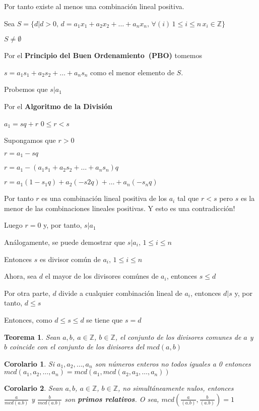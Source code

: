 \documentclass[a4paper,1pt]{report}
\newtheorem*{teo}{Teorema}
\newtheorem*{cor}{Corolario}
\begin{document}
Por tanto existe al menos una combinación lineal positiva.

Sea $S=\{d|d>0,\, d = a_1x_1+a_2x_2+\dots+a_nx_n,\, \forall (i)\, 1\leq i \leq n\, x_i\in\mathbb{Z}\}$

$S\neq \emptyset$

Por el \textbf{Principio del Buen Ordenamiento~(PBO)} tomemos 

$s=a_1s_1+a_2s_2+\dots+a_ns_n$ como el menor elemento de $S$.

Probemos que $s|a_1$

Por el \textbf{Algoritmo de la División}

$a_1=sq+r$ $0\leq r < s$ 

Supongamos que $r>0$

$r=a_1-sq$

$r=a_1 - (a_1s_1+a_2s_2+\dots+a_ns_n)q$

$r=a_1(1-s_1q)+a_2(-s2q)+\dots+a_n(-s_nq)$

Por tanto $r$ es una combinación lineal positiva de los $a_i$ tal que $r<s$ pero $s$ es la menor de las combinaciones lineales positivas. Y esto es una contradicción! 

Luego $r=0$ y, por tanto, $s|a_1$

Análogamente, se puede demostrar que $s|a_i,\, 1\leq i \leq n$

Entonces $s$ es divisor común de $a_i,\, 1\leq i \leq n$

Ahora, sea $d$ el mayor de los divisores comúnes de $a_i$, entonces $s\leq d$

Por otra parte, $d$ divide a cualquier combinación lineal de $a_i$, entonces $d|s$ y, por tanto, $d\leq s$

Entonces, como $d\leq s \leq d$ se tiene que $s=d$

\begin{teo}
 Sean $a,b$, $a\in\mathbb{Z}$, $b\in\mathbb{Z}$, el conjunto de los divisores comunes de $a$ y $b$ coincide con el conjunto de los divisores del $mcd(a,b)$
\end{teo}

\begin{cor}
 Si $a_1,a_2,\dots,a_n$ son números enteros no todos iguales a 0 entonces $mcd(a_1,a_2,\dots,a_n)=mcd(a_1,mcd(a_2,a_3,\dots,a_n))$
\end{cor}

\begin{cor}
 Sean $a,b$, $a\in\mathbb{Z}$, $b\in\mathbb{Z}$, no simultáneamente nulos, entonces $\frac{a}{mcd(a.b)}$ y  $\frac{b}{mcd(a.b)}$ son \textbf{primos relativos}. O sea, $mcd(\frac{a}{(a.b)},\frac{b}{(a.b)})=1$
\end{cor}
\end{document}
